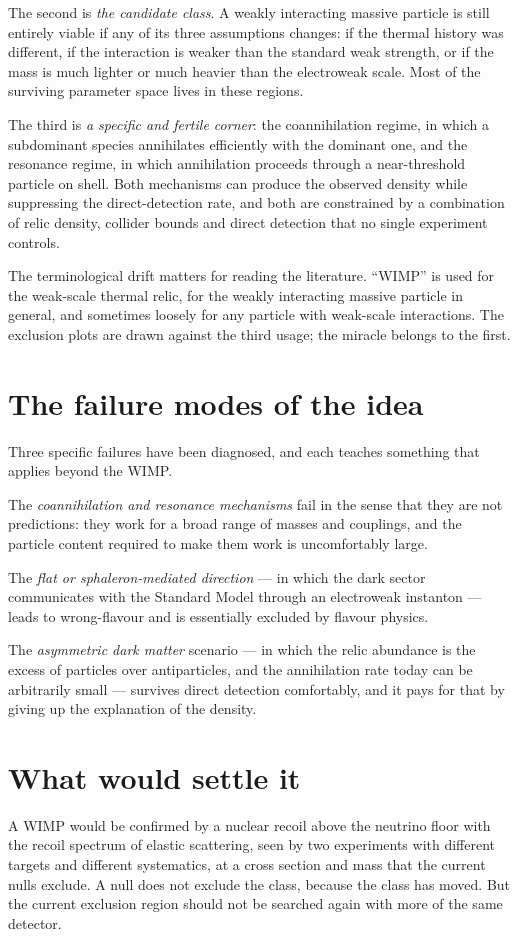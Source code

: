 The second is \emph{the candidate class}. A weakly interacting massive
particle is still entirely viable if any of its three assumptions changes:
if the thermal history was different, if the interaction is weaker than the
standard weak strength, or if the mass is much lighter or much heavier than
the electroweak scale. Most of the surviving parameter space lives in these
regions.

The third is \emph{a specific and fertile corner}: the coannihilation
regime, in which a subdominant species annihilates efficiently with the
dominant one, and the resonance regime, in which annihilation proceeds
through a near-threshold particle on shell. Both mechanisms can produce the
observed density while suppressing the direct-detection rate, and both are
constrained by a combination of relic density, collider bounds and direct
detection that no single experiment controls.

The terminological drift matters for reading the literature. ``WIMP'' is
used for the weak-scale thermal relic, for the weakly interacting massive
particle in general, and sometimes loosely for any particle with weak-scale
interactions. The exclusion plots are drawn against the third usage; the
miracle belongs to the first.

\section{The failure modes of the idea}Three specific failures have been diagnosed, and each
teaches something that applies beyond the WIMP.

The \emph{coannihilation and resonance mechanisms} fail in the sense that
they are not predictions: they work for a broad range of masses and
couplings, and the particle content required to make them work is
uncomfortably large.

The \emph{flat or sphaleron-mediated direction} --- in which the dark sector
communicates with the Standard Model through an electroweak instanton ---
leads to wrong-flavour and is essentially excluded by flavour physics.

The \emph{asymmetric dark matter} scenario --- in which the relic abundance
is the excess of particles over antiparticles, and the annihilation rate
today can be arbitrarily small --- survives direct detection comfortably, and
it pays for that by giving up the explanation of the density.

\section{What would settle it}A WIMP would be confirmed by a nuclear recoil above the
neutrino floor with the recoil spectrum of elastic scattering, seen by two
experiments with different targets and different systematics, at a
cross section and mass that the current nulls exclude. A null does not
exclude the class, because the class has moved. But the current exclusion
region should not be searched again with more of the same detector.

